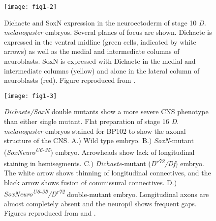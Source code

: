 \begin{figure}
\centering
\texttt{[image: fig1-2]}
\caption{Dichaete and SoxN expression in the neuroectoderm of stage 10 \emph{D. melanogaster} embryos. Several planes of focus are shown. Dichaete is expressed in the ventral midline (green cells, indicated by white arrows) as well as the medial and intermediate columns of neuroblasts. SoxN is expressed with Dichaete in the medial and intermediate columns (yellow) and alone in the lateral column of neuroblasts (red). Figure reproduced from \citet{overton_phd}.}
\label{Figure 1.2}
\end{figure} 

\begin{figure}
\centering
\texttt{[image: fig1-3]}
\caption{\emph{Dichaete/SoxN} double mutants show a more severe CNS phenotype than either single mutant. Flat preparation of stage 16 \emph{D. melanogaster} embryos stained for BP102 to show the axonal structure of the CNS. A.) Wild type embryo. B.) \emph{SoxN}-mutant (\emph{SoxNeuro\textsuperscript{U6-35}}) embryo. Arrowheads show lack of longitudinal staining in hemisegments. C.) \emph{Dichaete}-mutant (\emph{D\textsuperscript{r72}/Df}) embryo. The white arrow shows thinning of longitudinal connectives, and the black arrow shows fusion of commissural connectives. D.) \emph{SoxNeuro\textsuperscript{U6-35}/D\textsuperscript{r72}} double-mutant embryo. Longitudinal axons are almost completely absent and the neuropil shows frequent gaps. Figures reproduced from \citet{overton_evidence_2002} and \citet{soriano_drosophila_1998}.}
\label{Figure 1.3}
\end{figure}

